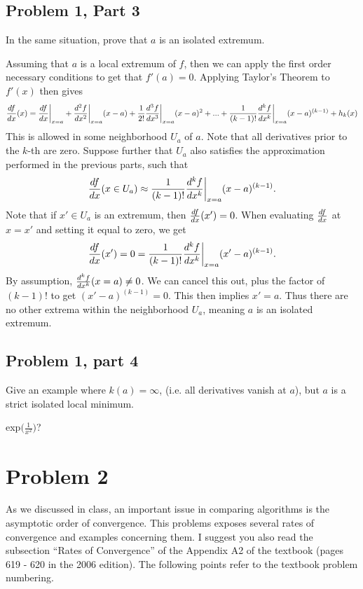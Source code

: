 \newpage
\subsection{Problem 1, Part 3}
In the same situation, prove that $a$ is an isolated extremum.
\partbreak
\begin{solution}

    Assuming that $a$ is a local extremum of $f$, then we can apply the first order necessary conditions to get that $f'(a) = 0$. Applying Taylor's Theorem to $f'(x)$ then gives
    \[
    \deriv{f}{x}{1} (x) = \deriv{f}{x}{1} \bigg|_{x = a} + \deriv{f}{x}{2}\bigg|_{x = a} (x - a) + \frac{1}{2!}\deriv{f}{x}{3}\bigg|_{x = a} (x - a)^2 + ... + \frac{1}{(k-1)!}\deriv{f}{x}{k} \bigg|_{x = a} (x - a)^{(k-1)} + h_k(x) 
    \]
    This is allowed in some neighborhood $U_a$ of $a$. Note that all derivatives prior to the $k$-th are zero. Suppose further that $U_a$ also satisfies the approximation performed in the previous parts, such that
    \[
    \deriv{f}{x}{1} (x \in U_a) \approx \frac{1}{(k-1)!}\deriv{f}{x}{k} \bigg|_{x = a}(x - a)^{(k-1)} .
    \]
    Note that if $x' \in U_a$ is an extremum, then $\deriv{f}{x}{1}(x') = 0$. When evaluating $\deriv{f}{x}{1}$ at $x = x'$ and setting it equal to zero, we get
    \[
    \deriv{f}{x}{1}(x') = 0 = \frac{1}{(k-1)!}\deriv{f}{x}{k} \bigg|_{x = a}(x' - a)^{(k-1)}.
    \]
    By assumption, $\deriv{f}{x}{k} (x = a) \neq 0$. We can cancel this out, plus the factor of $(k-1)!$ to get $(x' - a)^{(k-1)} = 0$. This then implies $x' = a$. Thus there are no other extrema within the neighborhood $U_a$, meaning $a$ is an isolated extremum. 
\end{solution}

\newpage
\subsection{Problem 1, part 4}
Give an example where $k(a) = \infty$, (i.e. all derivatives vanish at $a$), but $a$ is a strict isolated local minimum.
\partbreak
\begin{solution}
exp$\big(\frac{1}{x^2}\big)$?    
\end{solution}

\newpage
\section{Problem 2}
 As we discussed in class, an important issue in comparing algorithms is the asymptotic order of convergence. This problems exposes several rates of convergence and examples concerning them. I suggest you also read the subsection ``Rates of Convergence” of the Appendix A2 of the textbook (pages 619 - 620 in the 2006 edition). The following points refer to the textbook problem numbering. 
 
